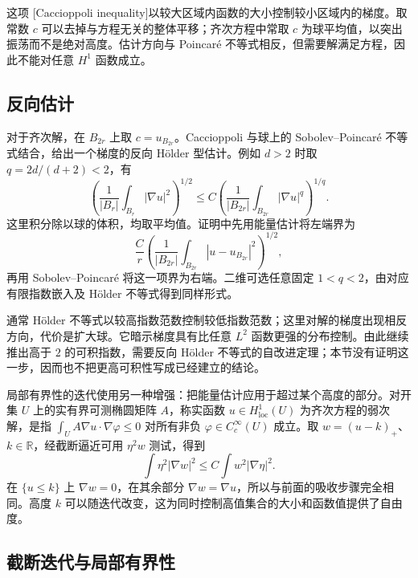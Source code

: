 这项 [Caccioppoli inequality]以较大区域内函数的大小控制较小区域内的梯度。取常数 \(c\) 可以去掉与方程无关的整体平移；齐次方程中常取 \(c\) 为球平均值，以突出振荡而不是绝对高度。估计方向与 Poincaré 不等式相反，但需要解满足方程，因此不能对任意 \(H^1\) 函数成立。

\subsection{反向估计}
\label{b2:subsec:160402}

对于齐次解，在 \(B_{2r}\) 上取 \(c=u_{B_{2r}}\)。Caccioppoli 与球上的 Sobolev--Poincaré 不等式结合，给出一个梯度的反向 Hölder 型估计。例如 \(d>2\) 时取 \(q=2d/(d+2)<2\)，有
\[
 \left(\frac1{|B_r|}\int_{B_r}|\nabla u|^2\right)^{1/2}
 \le C\left(\frac1{|B_{2r}|}\int_{B_{2r}}|\nabla u|^q\right)^{1/q}.
\]
这里积分除以球的体积，均取平均值。证明中先用能量估计将左端界为
\[
 \frac Cr\left(\frac1{|B_{2r}|}\int_{B_{2r}}|u-u_{B_{2r}}|^2\right)^{1/2},
\]
再用 Sobolev--Poincaré 将这一项界为右端。二维可选任意固定 \(1<q<2\)，由对应有限指数嵌入及 Hölder 不等式得到同样形式。

\ProseParagraphBreak

通常 Hölder 不等式以较高指数范数控制较低指数范数；这里对解的梯度出现相反方向，代价是扩大球。它暗示梯度具有比任意 \(L^2\) 函数更强的分布控制。由此继续推出高于 \(2\) 的可积指数，需要反向 Hölder 不等式的自改进定理；本节没有证明这一步，因而也不把更高可积性写成已经建立的结论。

\ProseParagraphBreak

局部有界性的迭代使用另一种增强：把能量估计应用于超过某个高度的部分。对开集 \(U\) 上的实有界可测椭圆矩阵 \(A\)，称实函数 \(u\in H^1_{\mathrm{loc}}(U)\) 为齐次方程的弱次解，是指 \(\int_U A\nabla u\cdot\nabla\varphi\le0\) 对所有非负 \(\varphi\in C_c^\infty(U)\) 成立。取 \(w=(u-k)_+\)、\(k\in\mathbb R\)，经截断逼近可用 \(\eta^2w\) 测试，得到
\[\int\eta^2|\nabla w|^2\le C\int w^2|\nabla\eta|^2.\]
在 \(\{u\le k\}\) 上 \(\nabla w=0\)，在其余部分 \(\nabla w=\nabla u\)，所以与前面的吸收步骤完全相同。高度 \(k\) 可以随迭代改变，这为同时控制高值集合的大小和函数值提供了自由度。

\subsection{截断迭代与局部有界性}
\label{b2:subsec:160403}

